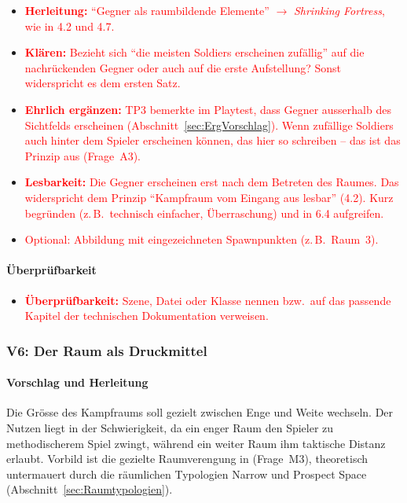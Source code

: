 \documentclass[../Main.tex]{subfiles}
\begin{document}
\begin{itemize}[leftmargin=1.5cm]
    \item \textcolor{red}{\textbf{Herleitung:} \enquote{Gegner als raumbildende Elemente} $\rightarrow$ \textit{Shrinking Fortress}, wie in 4.2 und 4.7.}
    \item \textcolor{red}{\textbf{Klären:} Bezieht sich \enquote{die meisten Soldiers erscheinen zufällig} auf die nachrückenden Gegner oder auch auf die erste Aufstellung? Sonst widerspricht es dem ersten Satz.}
    \item \textcolor{red}{\textbf{Ehrlich ergänzen:} TP3 bemerkte im Playtest, dass Gegner ausserhalb des Sichtfelds erscheinen (Abschnitt~\ref{sec:ErgVorschlag}). Wenn zufällige Soldiers auch hinter dem Spieler erscheinen können, das hier so schreiben -- das ist das Prinzip aus  (Frage~A3).}
    \item \textcolor{red}{\textbf{Lesbarkeit:} Die Gegner erscheinen erst nach dem Betreten des Raumes. Das widerspricht dem Prinzip \enquote{Kampfraum vom Eingang aus lesbar} (4.2). Kurz begründen (z.\,B.\ technisch einfacher, Überraschung) und in 6.4 aufgreifen.}
    \item \textcolor{red}{Optional: Abbildung mit eingezeichneten Spawnpunkten (z.\,B.\ Raum~3).}
\end{itemize}

\paragraph{Überprüfbarkeit}
\begin{itemize}[leftmargin=1.5cm]
    \item \textcolor{red}{\textbf{Überprüfbarkeit:} Szene, Datei oder Klasse nennen bzw.\ auf das passende Kapitel der technischen Dokumentation verweisen.}
\end{itemize}

\subsubsection{V6: Der Raum als Druckmittel} \label{sec:V6}

\paragraph{Vorschlag und Herleitung}
Die Grösse des Kampfraums soll gezielt zwischen Enge und Weite wechseln. Der Nutzen liegt in der Schwierigkeit, da ein enger Raum den Spieler zu methodischerem Spiel zwingt, während ein weiter Raum ihm taktische Distanz erlaubt. Vorbild ist die gezielte Raumverengung in  (Frage~M3), theoretisch untermauert durch die räumlichen Typologien Narrow und Prospect Space (Abschnitt~\ref{sec:Raumtypologien}).
\end{document}
